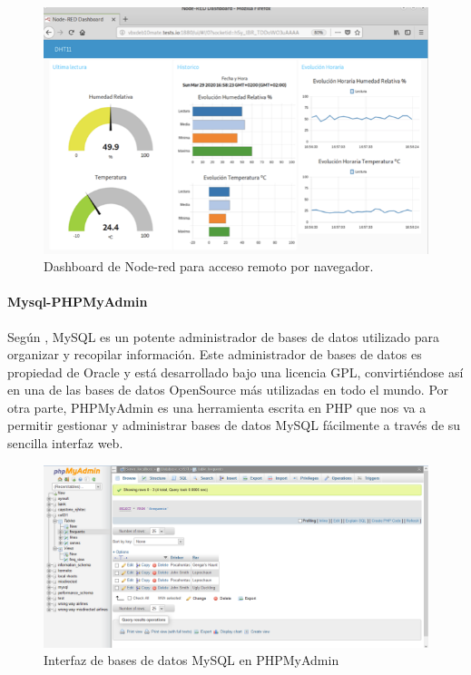\begin{figure}[H]
\centering
\includegraphics[scale=0.6]{images/nodereddash.png}
\caption{Dashboard de Node-red para acceso remoto por navegador.}
\end{figure}

\paragraph{Mysql-PHPMyAdmin} Según \cite{velasco2017}, MySQL es un potente administrador de bases de datos utilizado para organizar y recopilar información. Este administrador de bases de datos es propiedad de Oracle y está desarrollado bajo una licencia GPL, convirtiéndose así en una de las bases de datos OpenSource más utilizadas en todo el mundo. Por otra parte, PHPMyAdmin es una herramienta escrita en PHP que nos va a permitir gestionar y administrar bases de datos MySQL fácilmente a través de su sencilla interfaz web.

\begin{figure}[H]
\centering
\includegraphics[scale=0.4]{images/mysql.png}
\caption{Interfaz de bases de datos MySQL en PHPMyAdmin}
\end{figure}

